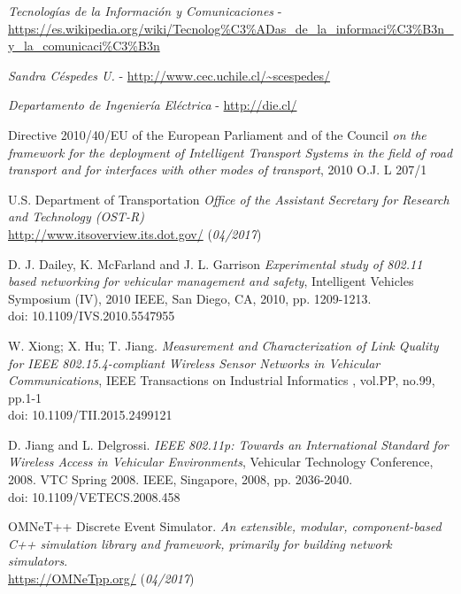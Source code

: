 \documentclass[11pt,letterpaper]{article}
\begin{document}
\begin{thebibliography}{5}
     \emph{Tecnologías de la Información y Comunicaciones} - \url{https://es.wikipedia.org/wiki/Tecnolog%C3%ADas_de_la_informaci%C3%B3n_y_la_comunicaci%C3%B3n}

     \emph{Sandra Céspedes U.} - \url{http://www.cec.uchile.cl/~scespedes/}

     \emph{Departamento de Ingeniería Eléctrica} - \url{http://die.cl/}

  		 Directive 2010/40/EU of the European Parliament and of the Council
  		\textit{on the framework for the deployment of Intelligent Transport Systems in the field of road transport and for interfaces with other modes of transport},
  		2010 O.J. L 207/1

  		 U.S. Department of Transportation
  		\textit{Office of the Assistant Secretary for Research and Technology (OST-R)}
  		\\\url{http://www.itsoverview.its.dot.gov/} (\textit{04/2017})

  		 D. J. Dailey, K. McFarland and J. L. Garrison
  		\textit{Experimental study of 802.11 based networking for vehicular management and safety},
  		Intelligent Vehicles Symposium (IV), 2010 IEEE, San Diego, CA, 2010, pp. 1209-1213.
  		\\doi: 10.1109/IVS.2010.5547955


  		 W. Xiong; X. Hu; T. Jiang.
  		\textit{Measurement and Characterization of Link Quality for IEEE 802.15.4-compliant Wireless Sensor Networks in Vehicular Communications},
  		IEEE Transactions on Industrial Informatics , vol.PP, no.99, pp.1-1
  		\\doi: 10.1109/TII.2015.2499121

  		 D. Jiang and L. Delgrossi.
  		\textit{IEEE 802.11p: Towards an International Standard for Wireless Access in Vehicular Environments}, Vehicular Technology Conference, 2008. VTC Spring 2008. IEEE, Singapore, 2008, pp. 2036-2040.
  		\\doi: 10.1109/VETECS.2008.458

  		 OMNeT++ Discrete Event Simulator.
  		\textit{An extensible, modular, component-based C++ simulation library and framework, primarily for building network simulators}.
  		\\\url{https://OMNeTpp.org/} (\textit{04/2017})


\end{thebibliography}
\end{document}
